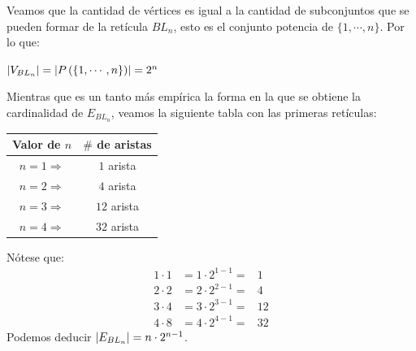 \documentclass{article}
\begin{document}
\begin{enumerate}
\begin{enumerate}
    Veamos que la cantidad de vértices es igual a la
    cantidad de subconjuntos que se pueden formar de
    la retícula $BL_n$, esto es el conjunto potencia
    de $\{1, \dotsm, n\}$. Por lo que:
    \begin{center}
      $\abs{V_{BL_n}} = \abs{P \left(\{1, \dotsm, n\}\right)} = 2^{n}$
    \end{center}
    Mientras que es un tanto más empírica la forma en
    la que se obtiene la cardinalidad de $E_{BL_n}$,
    veamos la siguiente tabla con las primeras retículas:
    \begin{center}
      \begin{tabular}{|c|c|}
        \hline
        Valor de $n$ & $\#$ de aristas \\
        \hline
        $n = 1 \Rightarrow$ & $1$ arista \\
        \hline
        $n = 2 \Rightarrow$ & $4$ arista \\
        \hline
        $n = 3 \Rightarrow$ & $12$ arista \\
        \hline
        $n = 4 \Rightarrow$ & $32$ arista \\
        \hline
      \end{tabular}
    \end{center}
    Nótese que:
    \begin{eqnarray*}
      1 \cdot 1 &= 1 \cdot 2^{1-1} =& 1\\
      2 \cdot 2 &= 2 \cdot 2^{2-1} =& 4\\
      3 \cdot 4 &= 3 \cdot 2^{3-1} =& 12\\
      4 \cdot 8 &= 4 \cdot 2^{4-1} =& 32
    \end{eqnarray*}
    Podemos deducir $\abs{E_{BL_n}} = n \cdot 2^{n-1}$.
    
    \begin{center}
    \end{center}
    

\end{enumerate}
\end{enumerate}
\end{document}
